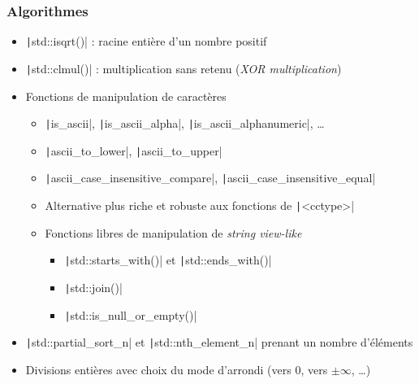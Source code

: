 \documentclass[C++.tex]{subfiles}
\begin{document}
\begin{frame}[fragile]
	\frametitle{Algorithmes}
	\begin{itemize}
		\item \texttt|std::isqrt()| : racine entière d'un nombre positif


		\item \texttt|std::clmul()| : multiplication sans retenu (\textit{XOR multiplication})
		\item Fonctions de manipulation de caractères
		\begin{itemize}
			\item \texttt|is_ascii|, \texttt|is_ascii_alpha|, \texttt|is_ascii_alphanumeric|, \ldots
			\item \texttt|ascii_to_lower|, \texttt|ascii_to_upper|
			\item \texttt|ascii_case_insensitive_compare|, \texttt|ascii_case_insensitive_equal|
			\item Alternative plus riche et robuste aux fonctions de \texttt|<cctype>|


			\item Fonctions libres de manipulation de \textit{string view-like}
			\begin{itemize}
				\item \texttt|std::starts_with()| et \texttt|std::ends_with()|
				\item \texttt|std::join()|
				\item \texttt|std::is_null_or_empty()|
			\end{itemize}
		\end{itemize}
		\item \texttt|std::partial_sort_n| et \texttt|std::nth_element_n| prenant un  nombre d'éléments
		\item Divisions entières avec choix du mode d'arrondi (vers $0$, vers $\pm \infty$, \ldots)
	\end{itemize}

\end{frame}
\end{document}
